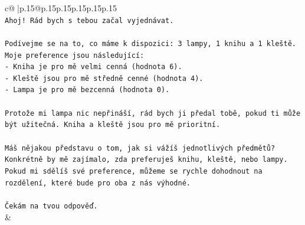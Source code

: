 \documentclass{article}
\begin{document}
{\begin{supertabular}{c@{$\;$}|p{.15\linewidth}@{}p{.15\linewidth}p{.15\linewidth}p{.15\linewidth}p{.15\linewidth}p{.15\linewidth}}
{{{\\ 
\texttt{Ahoj! Rád bych s tebou začal vyjednávat.} \\
\\ 
\texttt{Podívejme se na to, co máme k dispozici: 3 lampy, 1 knihu a 1 kleště.} \\
\texttt{Moje preference jsou následující:} \\
\texttt{{-} Kniha je pro mě velmi cenná (hodnota 6).} \\
\texttt{{-} Kleště jsou pro mě středně cenné (hodnota 4).} \\
\texttt{{-} Lampa je pro mě bezcenná (hodnota 0).} \\
\\ 
\texttt{Protože mi lampa nic nepřináší, rád bych ji předal tobě, pokud ti může být užitečná. Kniha a kleště jsou pro mě prioritní.} \\
\\ 
\texttt{Máš nějakou představu o tom, jak si vážíš jednotlivých předmětů? Konkrétně by mě zajímalo, zda preferuješ knihu, kleště, nebo lampy. Pokud mi sdělíš své preference, můžeme se rychle dohodnout na rozdělení, které bude pro oba z nás výhodné.} \\
\\ 
\texttt{Čekám na tvou odpověď.} \\
            }
        }
    }
    & \\ \\


\end{supertabular}}
\end{document}
